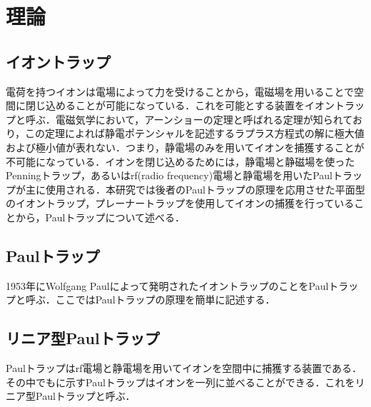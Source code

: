 \chapter{理論}
\section{イオントラップ}
電荷を持つイオンは電場によって力を受けることから，電磁場を用いることで空間に閉じ込めることが可能になっている．これを可能とする装置をイオントラップと呼ぶ．電磁気学において，アーンショーの定理と呼ばれる定理が知られており，この定理によれば静電ポテンシャルを記述するラプラス方程式の解に極大値および極小値が表れない．つまり，静電場のみを用いてイオンを捕獲することが不可能になっている．イオンを閉じ込めるためには，静電場と静磁場を使ったPenningトラップ，あるいはrf(radio frequency)電場と静電場を用いたPaulトラップが主に使用される．本研究では後者のPaulトラップの原理を応用させた平面型のイオントラップ，プレーナートラップを使用してイオンの捕獲を行っていることから，Paulトラップについて述べる．
\section{Paulトラップ}
1953年にWolfgang Paulによって発明されたイオントラップのことをPaulトラップと呼ぶ．ここではPaulトラップの原理を簡単に記述する．
\section{リニア型Paulトラップ}
Paulトラップはrf電場と静電場を用いてイオンを空間中に捕獲する装置である．その中でもに示すPaulトラップはイオンを一列に並べることができる．これをリニア型Paulトラップと呼ぶ．


